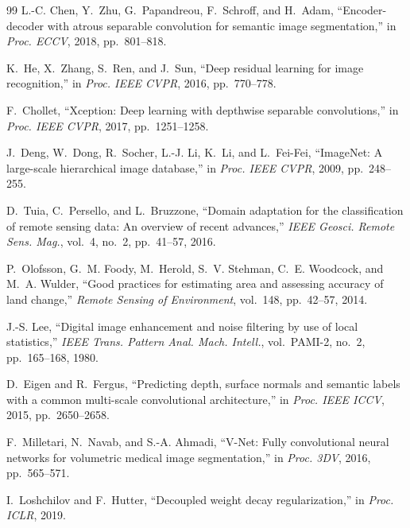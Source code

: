 \documentclass[12pt,conference]{IEEEtran}
\begin{document}
\begin{thebibliography}{99}
L.-C. Chen, Y.~Zhu, G.~Papandreou, F.~Schroff, and H.~Adam, ``Encoder-decoder with atrous separable convolution for
semantic image segmentation,'' in \emph{Proc. ECCV}, 2018, pp.~801--818.

K.~He, X.~Zhang, S.~Ren, and J.~Sun, ``Deep residual learning for image recognition,'' in \emph{Proc. IEEE CVPR},
2016, pp.~770--778.

F.~Chollet, ``Xception: Deep learning with depthwise separable convolutions,'' in \emph{Proc. IEEE CVPR}, 2017,
pp.~1251--1258.

J.~Deng, W.~Dong, R.~Socher, L.-J. Li, K.~Li, and L.~Fei-Fei, ``ImageNet: A large-scale hierarchical image database,''
in \emph{Proc. IEEE CVPR}, 2009, pp.~248--255.

D.~Tuia, C.~Persello, and L.~Bruzzone, ``Domain adaptation for the classification of remote sensing data: An overview
of recent advances,'' \emph{IEEE Geosci. Remote Sens. Mag.}, vol.~4, no.~2, pp.~41--57, 2016.

P.~Olofsson, G.~M. Foody, M.~Herold, S.~V. Stehman, C.~E. Woodcock, and M.~A. Wulder, ``Good practices for estimating
area and assessing accuracy of land change,'' \emph{Remote Sensing of Environment}, vol.~148, pp.~42--57, 2014.

J.-S. Lee, ``Digital image enhancement and noise filtering by use of local statistics,'' \emph{IEEE Trans. Pattern
Anal. Mach. Intell.}, vol.~PAMI-2, no.~2, pp.~165--168, 1980.

D.~Eigen and R.~Fergus, ``Predicting depth, surface normals and semantic labels with a common multi-scale
convolutional architecture,'' in \emph{Proc. IEEE ICCV}, 2015, pp.~2650--2658.

F.~Milletari, N.~Navab, and S.-A. Ahmadi, ``V-Net: Fully convolutional neural networks for volumetric medical image
segmentation,'' in \emph{Proc. 3DV}, 2016, pp.~565--571.

I.~Loshchilov and F.~Hutter, ``Decoupled weight decay regularization,'' in \emph{Proc. ICLR}, 2019.

\end{thebibliography}
\end{document}
